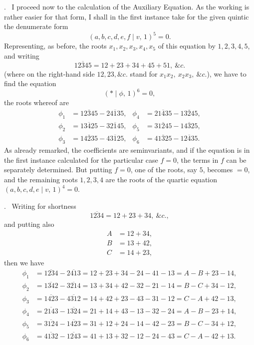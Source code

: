 \documentclass[11pt]{article}
\newcommand{\Cdel}{\mid}
\begin{document}
. \ I proceed now to the calculation of the Auxiliary Equation. As the working is rather easier for that form, I shall in the first instance take for the given quintic the denumerate form
\[
   (a, b, c, d, e, f\Cdel v,\,1)^5 = 0.
\]
Representing, as before, the roots $x_1, x_2, x_3, x_4, x_5$ of this equation by $1, 2, 3, 4, 5$, and writing
\[
   \overline{12345} = 12 + 23 + 34 + 45 + 51,\ \&c.
\]
(where on the right-hand side $12, 23, \&c.$ stand for $x_1 x_2,\ x_2 x_3,\ \&c.$), we have to find the equation
\[
   (*\Cdel\phi,\,1)^6 = 0,
\]
the roots whereof are
\[
\begin{aligned}
   \phi_1 &= \overline{12345} - \overline{24135},& \phi_4 &= \overline{21435} - \overline{13245},\\
   \phi_2 &= \overline{13425} - \overline{32145},& \phi_5 &= \overline{31245} - \overline{14325},\\
   \phi_3 &= \overline{14235} - \overline{43125},& \phi_6 &= \overline{41325} - \overline{12435}.
\end{aligned}
\]
As already remarked, the coefficients are seminvariants, and if the equation is in the first instance calculated for the particular case $f = 0$, the terms in $f$ can be separately determined. But putting $f = 0$, one of the roots, say $5$, becomes $= 0$, and the remaining roots $1, 2, 3, 4$ are the roots of the quartic equation $(a, b, c, d, e\Cdel v,\,1)^4 = 0$.

\medskip

. \ Writing for shortness
\[
   \overline{1234} = 12 + 23 + 34,\ \&c.,
\]
and putting also
\[
\begin{aligned}
   A &= 12 + 34,\\
   B &= 13 + 42,\\
   C &= 14 + 23,
\end{aligned}
\]
then we have
\[
\begin{aligned}
   \phi_1 &= \overline{1234} - \overline{2413} = 12 + 23 + 34 - 24 - 41 - 13 = A - B + 23 - 14,\\
   \phi_2 &= \overline{1342} - \overline{3214} = 13 + 34 + 42 - 32 - 21 - 14 = B - C + 34 - 12,\\
   \phi_3 &= \overline{1423} - \overline{4312} = 14 + 42 + 23 - 43 - 31 - 12 = C - A + 42 - 13,\\
   \phi_4 &= \overline{2143} - \overline{1324} = 21 + 14 + 43 - 13 - 32 - 24 = A - B - 23 + 14,\\
   \phi_5 &= \overline{3124} - \overline{1423} = 31 + 12 + 24 - 14 - 42 - 23 = B - C - 34 + 12,\\
   \phi_6 &= \overline{4132} - \overline{1243} = 41 + 13 + 32 - 12 - 24 - 43 = C - A - 42 + 13.
\end{aligned}
\]
\end{document}
